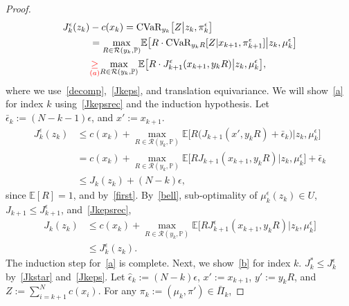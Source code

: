 \documentclass[letterpaper, 10 pt, conference]{ieeeconf}  %
\begin{document}
\begin{proof}
\begin{equation*}
\begin{aligned}
J_k^\epsilon(z_k)& - c(x_k) = \text{CVaR}_{y_k}\big[ Z \big| z_k, \pi_k^\epsilon \big]\\
& = {\underset{R \in \mathcal{R}(y_k, \mathbb{P})}\max}\mathbb{E}\big[ R\cdot \text{CVaR}_{y_k R}[ Z | x_{k+1}, \pi^\epsilon_{k+1} ] \big| z_k, \mu_k^\epsilon \big] \\
& \textcolor{red}{\underset{(a)}{\geq}} {\underset{R \in \mathcal{R}(y_k, \mathbb{P})}\max}\mathbb{E}\big[ R\cdot J_{k+1}^\epsilon(x_{k+1},y_k R) \big| z_k, \mu_k^\epsilon \big],
\end{aligned}\end{equation*}
%
where we use~\eqref{decomp},~\eqref{Jkeps}, and translation equivariance.\footnotemark 
{}
We will show~\eqref{a} for index $k$ using~\eqref{Jkepsrec} and the induction hypothesis. Let $\bar{\epsilon}_k := (N-k-1)\epsilon$, and $x' := x_{k+1}$.
%
\begin{equation*}\begin{aligned}
J_k^\epsilon(z_k) & \leq c(x_k) + {\underset{R \in \mathcal{R}(y_k, \mathbb{P})}\max} \mathbb{E}\big[ R\big(J_{k+1}(x',y_k R) + \bar{\epsilon}_k\big) \big| z_k, \mu_k^\epsilon \big]\\
& = c(x_k) + {\underset{R \in \mathcal{R}(y_k, \mathbb{P})}\max} \mathbb{E}\big[ R J_{k+1}(x_{k+1},y_k R) \big| z_k, \mu_k^\epsilon \big] + \bar{\epsilon}_k\\ 
& \leq J_k(z_k) + (N-k)\epsilon,
\end{aligned}\end{equation*}
%
since $\mathbb{E}[R] = 1$, and by~\eqref{first}. By~\eqref{bell}, sub-optimality of $\mu_k^\epsilon(z_k) \in U$, $J_{k+1} \leq J^\epsilon_{k+1}$, and~\eqref{Jkepsrec},
%
\begin{equation*}\begin{aligned}
J_k(z_k) & \leq c(x_k) + {\underset{R \in \mathcal{R}(y_k, \mathbb{P})}\max} \mathbb{E}\big[ R J^\epsilon_{k+1}(x_{k+1},y_k R) \big| z_k, \mu_k^\epsilon \big]\\
& \leq J_k^\epsilon(z_k). \end{aligned}\end{equation*}
%
The induction step for~\eqref{a} is complete. Next, we show~\eqref{b} for index $k$. $J_k^* \leq J_k^\epsilon$ by~\eqref{Jkstar} and~\eqref{Jkeps}.
Let $\hat{\epsilon}_k := (N-k)\epsilon$, $x':=x_{k+1}$, $y' := y_kR$, and $Z := \sum_{i=k+1}^N c(x_i)$. For any $\pi_k := (\mu_k, \pi') \in \bar{\Pi}_k$,

\end{proof}
\end{document}
